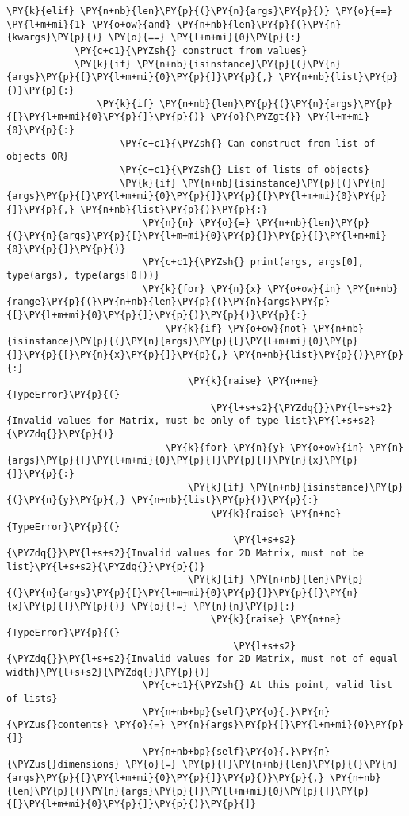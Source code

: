\begin{Verbatim}[commandchars=\\\{\}]
        \PY{k}{elif} \PY{n+nb}{len}\PY{p}{(}\PY{n}{args}\PY{p}{)} \PY{o}{==} \PY{l+m+mi}{1} \PY{o+ow}{and} \PY{n+nb}{len}\PY{p}{(}\PY{n}{kwargs}\PY{p}{)} \PY{o}{==} \PY{l+m+mi}{0}\PY{p}{:}
            \PY{c+c1}{\PYZsh{} construct from values}
            \PY{k}{if} \PY{n+nb}{isinstance}\PY{p}{(}\PY{n}{args}\PY{p}{[}\PY{l+m+mi}{0}\PY{p}{]}\PY{p}{,} \PY{n+nb}{list}\PY{p}{)}\PY{p}{:}
                \PY{k}{if} \PY{n+nb}{len}\PY{p}{(}\PY{n}{args}\PY{p}{[}\PY{l+m+mi}{0}\PY{p}{]}\PY{p}{)} \PY{o}{\PYZgt{}} \PY{l+m+mi}{0}\PY{p}{:}
                    \PY{c+c1}{\PYZsh{} Can construct from list of objects OR}
                    \PY{c+c1}{\PYZsh{} List of lists of objects}
                    \PY{k}{if} \PY{n+nb}{isinstance}\PY{p}{(}\PY{n}{args}\PY{p}{[}\PY{l+m+mi}{0}\PY{p}{]}\PY{p}{[}\PY{l+m+mi}{0}\PY{p}{]}\PY{p}{,} \PY{n+nb}{list}\PY{p}{)}\PY{p}{:}
                        \PY{n}{n} \PY{o}{=} \PY{n+nb}{len}\PY{p}{(}\PY{n}{args}\PY{p}{[}\PY{l+m+mi}{0}\PY{p}{]}\PY{p}{[}\PY{l+m+mi}{0}\PY{p}{]}\PY{p}{)}
                        \PY{c+c1}{\PYZsh{} print(args, args[0], type(args), type(args[0]))}
                        \PY{k}{for} \PY{n}{x} \PY{o+ow}{in} \PY{n+nb}{range}\PY{p}{(}\PY{n+nb}{len}\PY{p}{(}\PY{n}{args}\PY{p}{[}\PY{l+m+mi}{0}\PY{p}{]}\PY{p}{)}\PY{p}{)}\PY{p}{:}
                            \PY{k}{if} \PY{o+ow}{not} \PY{n+nb}{isinstance}\PY{p}{(}\PY{n}{args}\PY{p}{[}\PY{l+m+mi}{0}\PY{p}{]}\PY{p}{[}\PY{n}{x}\PY{p}{]}\PY{p}{,} \PY{n+nb}{list}\PY{p}{)}\PY{p}{:}
                                \PY{k}{raise} \PY{n+ne}{TypeError}\PY{p}{(}
                                    \PY{l+s+s2}{\PYZdq{}}\PY{l+s+s2}{Invalid values for Matrix, must be only of type list}\PY{l+s+s2}{\PYZdq{}}\PY{p}{)}
                            \PY{k}{for} \PY{n}{y} \PY{o+ow}{in} \PY{n}{args}\PY{p}{[}\PY{l+m+mi}{0}\PY{p}{]}\PY{p}{[}\PY{n}{x}\PY{p}{]}\PY{p}{:}
                                \PY{k}{if} \PY{n+nb}{isinstance}\PY{p}{(}\PY{n}{y}\PY{p}{,} \PY{n+nb}{list}\PY{p}{)}\PY{p}{:}
                                    \PY{k}{raise} \PY{n+ne}{TypeError}\PY{p}{(}
                                        \PY{l+s+s2}{\PYZdq{}}\PY{l+s+s2}{Invalid values for 2D Matrix, must not be list}\PY{l+s+s2}{\PYZdq{}}\PY{p}{)}
                                \PY{k}{if} \PY{n+nb}{len}\PY{p}{(}\PY{n}{args}\PY{p}{[}\PY{l+m+mi}{0}\PY{p}{]}\PY{p}{[}\PY{n}{x}\PY{p}{]}\PY{p}{)} \PY{o}{!=} \PY{n}{n}\PY{p}{:}
                                    \PY{k}{raise} \PY{n+ne}{TypeError}\PY{p}{(}
                                        \PY{l+s+s2}{\PYZdq{}}\PY{l+s+s2}{Invalid values for 2D Matrix, must not of equal width}\PY{l+s+s2}{\PYZdq{}}\PY{p}{)}
                        \PY{c+c1}{\PYZsh{} At this point, valid list of lists}
                        \PY{n+nb+bp}{self}\PY{o}{.}\PY{n}{\PYZus{}contents} \PY{o}{=} \PY{n}{args}\PY{p}{[}\PY{l+m+mi}{0}\PY{p}{]}
                        \PY{n+nb+bp}{self}\PY{o}{.}\PY{n}{\PYZus{}dimensions} \PY{o}{=} \PY{p}{[}\PY{n+nb}{len}\PY{p}{(}\PY{n}{args}\PY{p}{[}\PY{l+m+mi}{0}\PY{p}{]}\PY{p}{)}\PY{p}{,} \PY{n+nb}{len}\PY{p}{(}\PY{n}{args}\PY{p}{[}\PY{l+m+mi}{0}\PY{p}{]}\PY{p}{[}\PY{l+m+mi}{0}\PY{p}{]}\PY{p}{)}\PY{p}{]}


\end{Verbatim}
